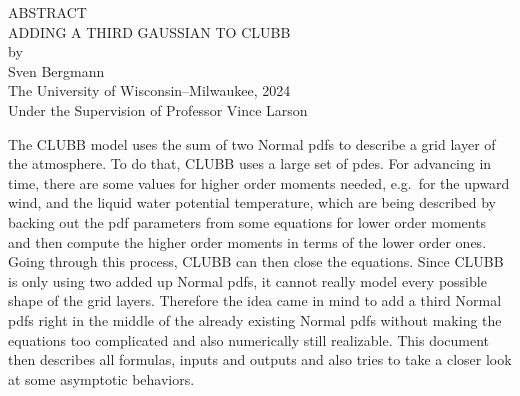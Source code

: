 \begin{center}
    ABSTRACT
    \\
    \singlespacing
    ADDING A THIRD GAUSSIAN TO CLUBB\\
    \doublespacing
    by\\
    Sven Bergmann\\
    \singlespacing
    The University of Wisconsin--Milwaukee, 2024\\
    Under the Supervision of Professor Vince Larson
\end{center}

The \gls{CLUBB} model uses the sum of two Normal \glspl{pdf} to describe a grid layer of the atmosphere.
To do that, \gls{CLUBB} uses a large set of \glspl{pde}.
For advancing in time, there are some values for higher order moments needed, e.g.\ for the upward wind, and the liquid water potential temperature, which are being described by backing out the \gls{pdf} parameters from some equations for lower order moments and then compute the higher order moments in terms of the lower order ones.
Going through this process, \gls{CLUBB} can then close the equations.
Since \gls{CLUBB} is only using two added up Normal \glspl{pdf}, it cannot really model every possible shape of the grid layers.
Therefore the idea came in mind to add a third Normal \glspl{pdf} right in the middle of the already existing Normal \glspl{pdf} without making the equations too complicated and also numerically still realizable.
This document then describes all formulas, inputs and outputs and also tries to take a closer look at some asymptotic behaviors.
